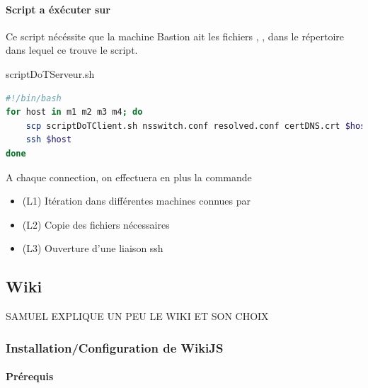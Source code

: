 \documentclass{article}
\begin{document}
\newpage

\paragraph{Script a éxécuter sur \\}
Ce script nécéssite que la machine Bastion ait les fichiers , ,  dans le répertoire dans lequel ce trouve le script.

\begin{codebox}{scriptDoTServeur.sh}
\begin{lstlisting}[language=Bash]
#!/bin/bash
for host in m1 m2 m3 m4; do
    scp scriptDoTClient.sh nsswitch.conf resolved.conf certDNS.crt $host:/tmp/
    ssh $host
done
\end{lstlisting}
\end{codebox}
A chaque connection, on effectuera en plus la commande 
\begin{itemize}
	 \item (L1) Itération dans différentes machines connues par 
	 \item (L2) Copie des fichiers nécessaires
	 \item (L3) Ouverture d'une liaison ssh
\end{itemize}


\subsection{Wiki}

SAMUEL EXPLIQUE UN PEU LE WIKI ET SON CHOIX

\subsubsection{Installation/Configuration de WikiJS}

\paragraph{Prérequis\\}
\end{document}
